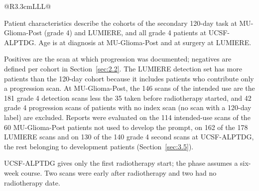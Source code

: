 \documentclass[largeformat]{interact} %
\begin{document}
\begin{table}[!htbp]
\begin{threeparttable}
\begin{tabularx}{\linewidth}{@{}R{3.3cm}LLL@{}}
\bottomrule
\end{tabularx}
\begin{tablenotes}\footnotesize
\item[a] Patient characteristics describe the cohorts of the secondary 120-day task at MU-Glioma-Post (grade 4)
and LUMIERE, and all grade 4 patients at UCSF-ALPTDG. Age is at diagnosis at MU-Glioma-Post and at surgery at
LUMIERE.
\item[b] Positives are the scan at which progression was documented; negatives are defined per cohort in
Section~\ref{sec:2.2}. The LUMIERE detection set has more patients than the 120-day cohort because it includes patients
who contribute only a progression scan. At MU-Glioma-Post, the 146 scans of the intended use are the 181 grade 4
detection scans less the 35 taken before radiotherapy started, and 42 grade 4 progression scans of patients with no
index scan (no scan with a 120-day label) are excluded. Reports were evaluated on the 114 intended-use scans of the
60 MU-Glioma-Post patients not used to develop the prompt, on 162 of the 178 LUMIERE scans and on 130 of the 140
grade 4 second scans at UCSF-ALPTDG, the rest belonging to development patients (Section~\ref{sec:3.5}).
\item[c] UCSF-ALPTDG gives only the first radiotherapy start; the phase assumes a six-week course. Two scans were
early after radiotherapy and two had no radiotherapy date.
\end{tablenotes}
\end{threeparttable}
\end{table}
\end{document}
